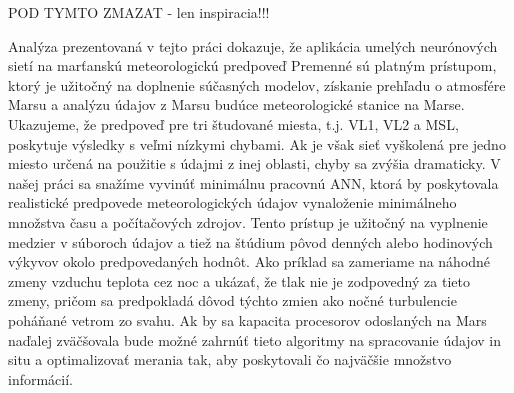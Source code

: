 


POD TYMTO ZMAZAT - len inspiracia!!!

Analýza prezentovaná v tejto práci dokazuje, že aplikácia umelých neurónových sietí na marťanskú meteorologickú predpoveď
Premenné sú platným prístupom, ktorý je užitočný na doplnenie súčasných modelov, získanie prehľadu o atmosfére Marsu a analýzu údajov z Marsu
budúce meteorologické stanice na Marse.
Ukazujeme, že predpoveď pre tri študované miesta, t.j. VL1, VL2 a MSL, poskytuje výsledky s veľmi nízkymi chybami.
Ak je však sieť vyškolená pre jedno miesto určená na použitie s údajmi z inej oblasti, chyby sa zvýšia
dramaticky.
V našej práci sa snažíme vyvinúť minimálnu pracovnú ANN, ktorá by poskytovala realistické predpovede meteorologických údajov
vynaloženie minimálneho množstva času a počítačových zdrojov. Tento prístup je užitočný na vyplnenie medzier v súboroch údajov a tiež na štúdium
pôvod denných alebo hodinových výkyvov okolo predpovedaných hodnôt. Ako príklad sa zameriame na náhodné zmeny vzduchu
teplota cez noc a ukázať, že tlak nie je zodpovedný za tieto zmeny, pričom sa predpokladá dôvod týchto zmien
ako nočné turbulencie poháňané vetrom zo svahu. Ak by sa kapacita procesorov odoslaných na Mars naďalej zväčšovala
bude možné zahrnúť tieto algoritmy na spracovanie údajov in situ a optimalizovať merania tak, aby poskytovali čo najväčšie množstvo
informácií.